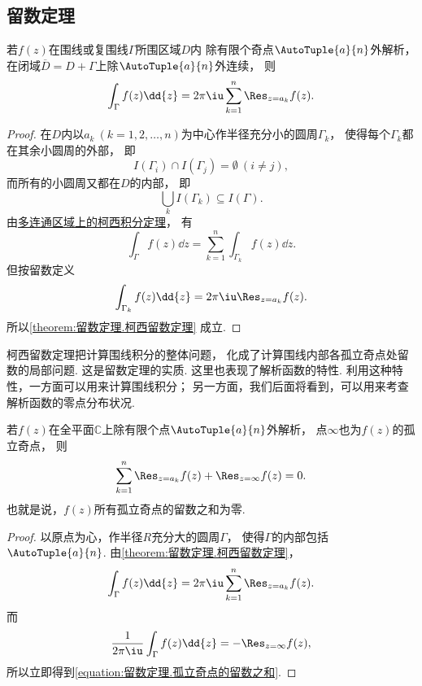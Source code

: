 \subsection{留数定理}
\begin{theorem}[柯西留数定理]\label{theorem:留数定理.柯西留数定理}
若\(f(z)\)在围线或复围线\(\Gamma\)所围区域\(D\)内
除有限个奇点\(\AutoTuple{a}{n}\)外解析，
在闭域\(\overline{D}=D+\Gamma\)上除\(\AutoTuple{a}{n}\)外连续，
则\begin{equation}\label{equation:留数定理.柯西留数定理}
	\int_\Gamma f(z) \dd{z}
	= 2\pi\iu \sum_{k=1}^n \Res_{z=a_k} f(z).
\end{equation}
\begin{proof}
在\(D\)内以\(a_k\ (k=1,2,\dotsc,n)\)为中心作半径充分小的圆周\(\Gamma_k\)，
使得每个\(\Gamma_k\)都在其余小圆周的外部，
即\[
	I(\Gamma_i) \cap I(\Gamma_j) = \emptyset\ (i \neq j),
\]
而所有的小圆周又都在\(D\)的内部，
即\[
	\bigcup_k I(\Gamma_k) \subseteq I(\Gamma).
\]
由\hyperref[theorem:解析函数的积分表示.多连通区域的柯西积分定理]{多连通区域上的柯西积分定理}，
有\[
	\int_\Gamma f(z) \dd{z}
	= \sum_{k=1}^n \int_{\Gamma_k} f(z) \dd{z}.
\]
但按留数定义\[
	\int_{\Gamma_k} f(z) \dd{z} = 2\pi\iu \Res_{z=a_k} f(z).
\]
所以\cref{theorem:留数定理.柯西留数定理} 成立.
\end{proof}
\end{theorem}
柯西留数定理把计算围线积分的整体问题，
化成了计算围线内部各孤立奇点处留数的局部问题.
这是留数定理的实质.
这里也表现了解析函数的特性.
利用这种特性，一方面可以用来计算围线积分；
另一方面，我们后面将看到，可以用来考查解析函数的零点分布状况.

\begin{theorem}\label{theorem:留数定理.孤立奇点的留数之和}
若\(f(z)\)在全平面\(\mathbb{C}\)上除有限个点\(\AutoTuple{a}{n}\)外解析，
点\(\infty\)也为\(f(z)\)的孤立奇点，
则\begin{equation}\label{equation:留数定理.孤立奇点的留数之和}
	\sum_{k=1}^n \Res_{z=a_k} f(z) + \Res_{z=\infty} f(z) = 0.
\end{equation}
也就是说，\(f(z)\)所有孤立奇点的留数之和为零.
\begin{proof}
以原点为心，作半径\(R\)充分大的圆周\(\Gamma\)，
使得\(\Gamma\)的内部包括\(\AutoTuple{a}{n}\).
由\cref{theorem:留数定理.柯西留数定理}，\[
	\int_\Gamma f(z) \dd{z}
	= 2\pi\iu \sum_{k=1}^n \Res_{z=a_k} f(z).
\]
而\[
	\frac{1}{2\pi\iu} \int_\Gamma f(z) \dd{z}
	= -\Res_{z=\infty} f(z),
\]
所以立即得到\cref{equation:留数定理.孤立奇点的留数之和}.
\end{proof}
\end{theorem}

